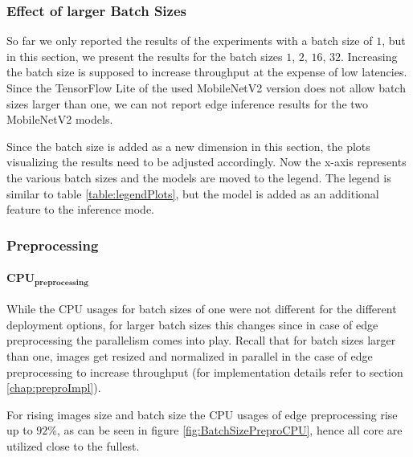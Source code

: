 \subsubsection{Effect of larger Batch Sizes}
\label{chap:resultsBatchSize}
So far we only reported the results of the experiments with a batch size of $1$, but in this section, we present the results for the batch sizes $1$, $2$, $16$, $32$.
Increasing the batch size is supposed to increase throughput at the expense of low latencies.
Since the TensorFlow Lite of the used MobileNetV2 version does not allow batch sizes larger than one, we can not report edge inference results for the two MobileNetV2 models.

Since the batch size is added as a new dimension in this section, the plots visualizing the results need to be adjusted accordingly.
Now the x-axis represents the various batch sizes and the models are moved to the legend. 
The legend is similar to table \ref{table:legendPlots}, but the model is added as an additional feature to the inference mode.
\subsubsection{Preprocessing}

\paragraph{$\mathbf{CPU_{preprocessing}}$}
While the CPU usages for batch sizes of one were not different for the different deployment options, for larger batch sizes this changes since in case of edge preprocessing the parallelism comes into play.
Recall that for batch sizes larger than one, images get resized and normalized in parallel in the case of edge preprocessing to increase throughput (for implementation details refer to section \ref{chap:preproImpl}).

For rising images size and batch size the CPU usages of edge preprocessing rise up to $92\%$, as can be seen in figure \ref{fig:BatchSizePreproCPU}, hence all core are utilized close to the fullest.


